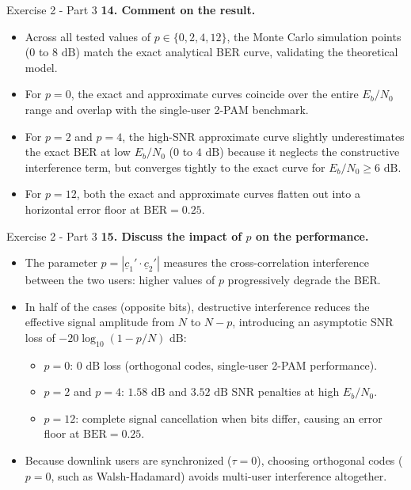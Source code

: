 \documentclass[10pt, aspectratio=169]{beamer}
\newcommand{\question}[1]{{\color{QuestionRed}\textbf{#1}}}
\begin{document}
	\begin{frame}{Exercise 2 - Part 3}
		\question{14. Comment on the result.}
		
		\vspace{0.1cm}
		\begin{itemize}
			\item Across all tested values of $p \in \{0, 2, 4, 12\}$, the Monte Carlo simulation points ($0$ to $8\text{ dB}$) match the exact analytical BER curve, validating the theoretical model.
			\item For $p = 0$, the exact and approximate curves coincide over the entire $E_b/N_0$ range and overlap with the single-user 2-PAM benchmark.
			\item For $p = 2$ and $p = 4$, the high-SNR approximate curve slightly underestimates the exact BER at low $E_b/N_0$ ($0$ to $4\text{ dB}$) because it neglects the constructive interference term, but converges tightly to the exact curve for $E_b/N_0 \ge 6\text{ dB}$.
			\item For $p = 12$, both the exact and approximate curves flatten out into a horizontal error floor at $\text{BER} = 0.25$.
		\end{itemize}
		
	\end{frame}
	
	\begin{frame}{Exercise 2 - Part 3}
		\question{15. Discuss the impact of $p$ on the performance.}
		
		\vspace{0.1cm}
		\begin{itemize}
			\item The parameter $p = |\underline{c}_1' \cdot \underline{c}_2'|$ measures the cross-correlation interference between the two users: higher values of $p$ progressively degrade the BER.
			\item In half of the cases (opposite bits), destructive interference reduces the effective signal amplitude from $N$ to $N - p$, introducing an asymptotic SNR loss of $-20\log_{10}(1 - p/N)\text{ dB}$:
			\begin{itemize}
				\item $p = 0$: $0\text{ dB}$ loss (orthogonal codes, single-user 2-PAM performance).
				\item $p = 2$ and $p = 4$: $1.58\text{ dB}$ and $3.52\text{ dB}$ SNR penalties at high $E_b/N_0$.
				\item $p = 12$: complete signal cancellation when bits differ, causing an error floor at $\text{BER} = 0.25$.
			\end{itemize}
			\item Because downlink users are synchronized ($\tau = 0$), choosing orthogonal codes ($p = 0$, such as Walsh-Hadamard) avoids multi-user interference altogether.
		\end{itemize}
		
	\end{frame}
	
\end{document}
